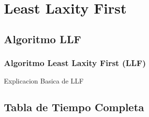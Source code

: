 \documentclass[xcolor=table]{beamer}
\begin{document}

\section{Least Laxity First}

\subsection{Algoritmo LLF}

\begin{frame} 
\frametitle{Algoritmo Least Laxity First (LLF)} 
Explicacion Basica de LLF \\
\end{frame}

\subsection{Tabla de Tiempo Completa} 
\end{document}

